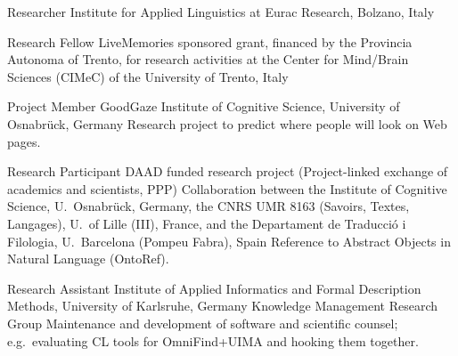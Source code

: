 
        {Researcher}
        {Institute for Applied Linguistics at Eurac Research, Bolzano, Italy}
        {}{}{}

        {Research Fellow}
        {LiveMemories sponsored grant, financed by the Provincia Autonoma of
        Trento, for research activities at the Center for Mind/Brain Sciences
        (CIMeC) of the University of Trento, Italy}
        {}{}{}


        {Project Member}
        {GoodGaze}
        {Institute of Cognitive Science, University of Osnabrück, Germany}
        {}
        {Research project to predict where people will look on Web pages.}


        {Research Participant}
        {DAAD funded research project (Project-linked exchange of academics and
        scientists, PPP)}
        {Collaboration between the Institute of Cognitive Science,
        U.~Osnabr\"{u}ck, Germany, the CNRS UMR 8163 (Savoirs, Textes,
        Langages), U.~of Lille (III), France, and the Departament de
        Traducci\'{o} i Filologia, U.~Barcelona (Pompeu Fabra), Spain}
        {}
        {Reference to Abstract Objects in Natural Language
        (OntoRef).}

        {Research Assistant}
        {}
        {Institute of Applied Informatics and Formal Description Methods,
        University of Karlsruhe, Germany} 
        {Knowledge Management Research Group}
        {Maintenance and development of software and scientific counsel;
        e.g.~evaluating CL tools for OmniFind+UIMA and hooking them together.}

